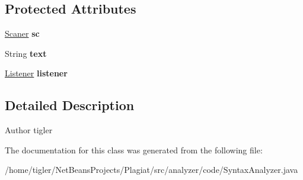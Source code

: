 \subsection*{Protected Attributes}
\begin{DoxyCompactItemize}
\item 
\mbox{\label{classanalyzer_1_1code_1_1SyntaxAnalyzer_af2fdfde9049c0b9d77d8bbacc5a67496}} 
\hyperlink{classanalyzer_1_1code_1_1Scaner}{Scaner} {\bfseries sc}
\item 
\mbox{\label{classanalyzer_1_1code_1_1SyntaxAnalyzer_a8aceea502e1f902fbd3200f0a514d536}} 
String {\bfseries text}
\item 
\mbox{\label{classanalyzer_1_1code_1_1SyntaxAnalyzer_a48ccf4c34b0824b9463924ac99f76bc5}} 
\hyperlink{classanalyzer_1_1code_1_1Listener}{Listener} {\bfseries listener}
\end{DoxyCompactItemize}


\subsection{Detailed Description}
\begin{DoxyAuthor}{Author}
tigler 
\end{DoxyAuthor}


The documentation for this class was generated from the following file\+:\begin{DoxyCompactItemize}
\item 
/home/tigler/\+Net\+Beans\+Projects/\+Plagiat/src/analyzer/code/Syntax\+Analyzer.\+java\end{DoxyCompactItemize}
